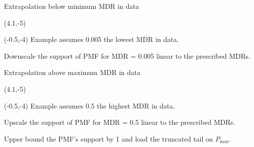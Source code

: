 \documentclass[aspectratio=169]{beamer}
\begin{document}
\begin{frame}{Extrapolation below minimum MDR in data}
\begin{textblock}{1}(4.1,-5)
\end{textblock}


\begin{textblock}{3}(-0.5,-4)
Example assumes 0.005 the lowest MDR in data.\bigskip

Downscale the support of PMF for MDR = 0.005 linear to the prescribed MDRs. 

\end{textblock}
\end{frame}


\begin{frame}{Extrapolation above maximum MDR in data}
\begin{textblock}{1}(4.1,-5)
\end{textblock}


\begin{textblock}{4}(-0.5,-4)
Example assumes 0.5 the highest MDR in data.\bigskip

Upscale the support of PMF for MDR = 0.5 linear to the prescribed MDRs.\bigskip

Upper bound the PMF's support by 1 and load the truncated tail on $P_{\max}$.

\end{textblock}
\end{frame}
\end{document}
